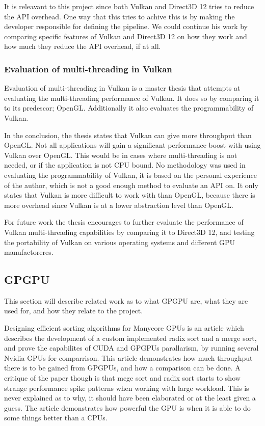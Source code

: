 It is releavant to this project  since both Vulkan and Direct3D 12 tries to reduce the \gls{API} overhead.
One way that this tries to achive this is by making the developer responsible for defining the pipeline.
We could continue his work by comparing specific features of Vulkan and Direct3D 12 on how they work and how much they reduce the \gls{API} overhead, if at all.

\subsubsection{Evaluation of multi-threading in Vulkan}

Evaluation of multi-threading in Vulkan \cite{blackert_2016_evaluation} is a master thesis that attempts at evaluating the multi-threading performance of Vulkan. It does so by comparing it to its predescor; OpenGL. 
Additionally it also evaluates the programmability of Vulkan. 

In the conclusion, the thesis states that Vulkan can give more throughput than OpenGL.
Not all applications will gain a significant performance boost with using Vulkan over OpenGL. 
This would be in cases where multi-threading is not needed, or if the application is not CPU bound. 
No methodology was used in evaluating the programmability of Vulkan, it is based on the personal experience of the author, which is not a good enough method to evaluate an \gls{API} on. 
It only states that Vulkan is more difficult to work with than OpenGL, because there is more overhead since Vulkan is at a lower abstraction level than OpenGL. 

For future work the thesis encourages to further evaluate the performance of Vulkan multi-threading  capabilities by comparing it to Direct3D 12, and testing the portability of Vulkan on various operating systems and different \gls{GPU} manufactoreres.

\subsection{\gls{GPGPU}}
This section will describe related work as to what GP\gls{GPU} are, what they are used for, and how they relate to the project.

Designing efficient sorting algorithms for Manycore \glspl{GPU} \cite{satish_2009_designing} is an article which describes the development of a custom implemented radix sort and a merge sort, and prove the capabilites of CUDA and \glspl{GPGPU} parallarism, by running several Nvidia \glspl{GPU} for comparrison. 
This article demonstrates how much throughput there is to be gained from \glspl{GPGPU}, and how a comparison can be done. 
A critique of the paper though is that mege sort and radix sort starts to show strange performance spike patterns when working with large workload. 
This is never explained as to why, it should have been elaborated or at the least given a guess.
The article demonstrates how powerful the \gls{GPU} is when it is able to do some things better than a \glspl{CPU}.

